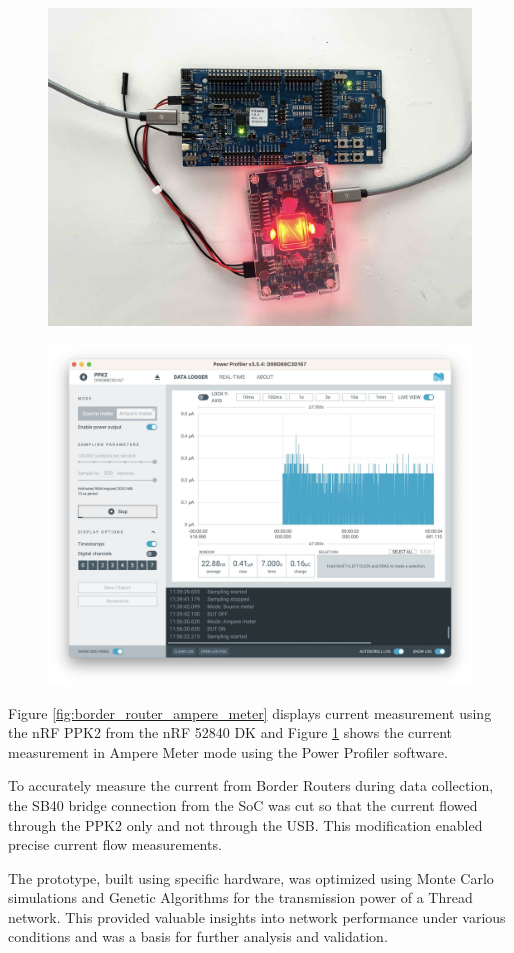 \begin{figure}[h]
    \centering
    \begin{minipage}[t]{0.45\textwidth}
        \centering
        \includegraphics[width=0.7\linewidth]{images/research_design/PPK2_Border_Router.jpg}
        \label{fig:border_router_ampere_meter}
    \end{minipage}\hfill
    \begin{minipage}[t]{0.45\textwidth}
        \centering
        \includegraphics[width=0.7\linewidth]{images/research_design/PPK2_SDK_Ampere.jpg}
        \label{fig:ppk2_ampere_meter}
    \end{minipage}
\end{figure}

Figure \ref{fig:border_router_ampere_meter} displays current measurement using the nRF PPK2 from the nRF 52840 DK and Figure \ref{fig:ppk2_ampere_meter} shows the current measurement in Ampere Meter mode using the Power Profiler software.

\vspace{2mm}
To accurately measure the current from Border Routers during data collection, the SB40 bridge connection from the SoC was cut so that the current flowed through the PPK2 only and not through the USB. This modification enabled precise current flow measurements.

The prototype, built using specific hardware, was optimized using Monte Carlo simulations and Genetic Algorithms for the transmission power of a Thread network. This provided valuable insights into network performance under various conditions and was a basis for further analysis and validation.
